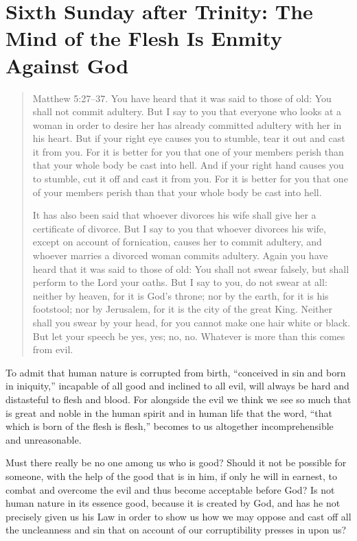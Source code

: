 

\section{Sixth Sunday after Trinity: The Mind of the Flesh Is Enmity Against God}

\begin{quote}

Matthew 5:27–37. You have heard that it was said to those of old: You shall not commit adultery. But I say to you that everyone who looks at a woman in order to desire her has already committed adultery with her in his heart. But if your right eye causes you to stumble, tear it out and cast it from you. For it is better for you that one of your members perish than that your whole body be cast into hell. And if your right hand causes you to stumble, cut it off and cast it from you. For it is better for you that one of your members perish than that your whole body be cast into hell. 

It has also been said that whoever divorces his wife shall give her a certificate of divorce. But I say to you that whoever divorces his wife, except on account of fornication, causes her to commit adultery, and whoever marries a divorced woman commits adultery. Again you have heard that it was said to those of old: You shall not swear falsely, but shall perform to the Lord your oaths. But I say to you, do not swear at all: neither by heaven, for it is God’s throne; nor by the earth, for it is his footstool; nor by Jerusalem, for it is the city of the great King. Neither shall you swear by your head, for you cannot make one hair white or black. But let your speech be yes, yes; no, no. Whatever is more than this comes from evil.

\end{quote}

\bigskip


To admit that human nature is corrupted from birth, “conceived in sin and born in iniquity,” incapable of all good and inclined to all evil, will always be hard and distasteful to flesh and blood. For alongside the evil we think we see so much that is great and noble in the human spirit and in human life that the word, “that which is born of the flesh is flesh,” becomes to us altogether incomprehensible and unreasonable.

Must there really be no one among us who is good? Should it not be possible for someone, with the help of the good that is in him, if only he will in earnest, to combat and overcome the evil and thus become acceptable before God? Is not human nature in its essence good, because it is created by God, and has he not precisely given us his Law in order to show us how we may oppose and cast off all the uncleanness and sin that on account of our corruptibility presses in upon us?

